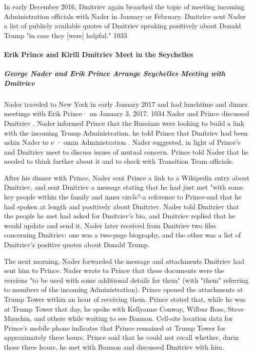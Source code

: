In early December 2016, Dmitriev again broached the topic of meeting incoming Administration officials with Nader in January or February.%
Dmitriev sent Nader a list of publicly available quotes of Dmitriev speaking positively about Donald Trump "in case they [were] helpful." 1033

\paragraph{Erik Prince and Kirill Dmitriev Meet in the Seychelles}

\subparagraph{George Nader and Erik Prince Arrange Seychelles Meeting with Dmitriev}

Nader traveled to New York in early January 2017 and had lunchtime and dinner meetings with Erik Prince· on January 3, 2017. 1034 Nader and Prince discussed Dmitriev .%
Nader informed Prince that the Russians were looking to build a link with the incoming Trump Administration.%
he told Prince that Dmitriev had been ushin Nader to e · omin Administration .%
Nader suggested, in light of Prince's and Dmitriev meet to discuss issues of mutual concern.%
Prince told Nader that he needed to think further about it and to check with Transition Team officials.%

After his dinner with Prince, Nader sent Prince a link to a Wikipedia entry about Dmitriev, and sent Dmitriev a message stating that he had just met "with some key people within the family and inner circle"-a reference to Prince-and that he had spoken at length and positively about Dmitriev.%
Nader told Dmitriev that the people he met had asked for Dmitriev's bio, and Dmitriev replied that he would update and send it.%
Nader later received from Dmitriev two files concerning Dmitriev: one was a two-page biography, and the other was a list of Dmitriev's positive quotes about Donald Trump.%

The next morning, Nader forwarded the message and attachments Dmitriev had sent him to Prince.%
Nader wrote to Prince that these documents were the versions "to be used with some additional details for them" (with "them" referring to members of the incoming Administration).%
Prince opened the attachments at Trump Tower within an hour of receiving them.%
Prince stated that, while he was at Trump Tower that day, he spoke with Kellyanne Conway, Wilbur Ross, Steve Mnuchin, and others while waiting to see Bannon.%
Cell-site location data for Prince's mobile phone indicates that Prince remained at Trump Tower for approximately three hours.%
Prince said that he could not recall whether, durin those three hours, he met with Bannon and discussed Dmitriev with him.%

